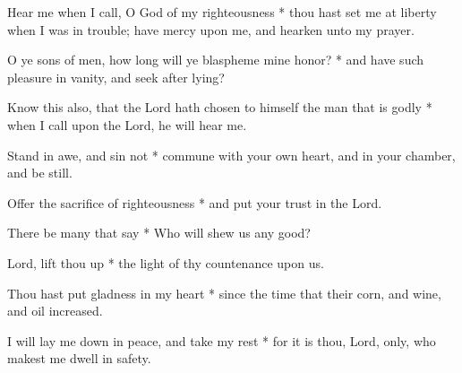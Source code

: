 Hear me when I call, O God of my righteousness * thou hast set me at liberty when I was in trouble; have mercy upon me, and hearken unto my prayer.

O ye sons of men, how long will ye blaspheme mine honor? * and have such pleasure in vanity, and seek after lying?

Know this also, that the Lord hath chosen to himself the man that is godly * when I call upon the Lord, he will hear me.

Stand in awe, and sin not * commune with your own heart, and in your chamber, and be still.

Offer the sacrifice of righteousness * and put your trust in the Lord.

There be many that say * Who will shew us any good?

Lord, lift thou up * the light of thy countenance upon us.

Thou hast put gladness in my heart * since the time that their corn, and wine, and oil increased.

I will lay me down in peace, and take my rest * for it is thou, Lord, only, who makest me dwell in safety.